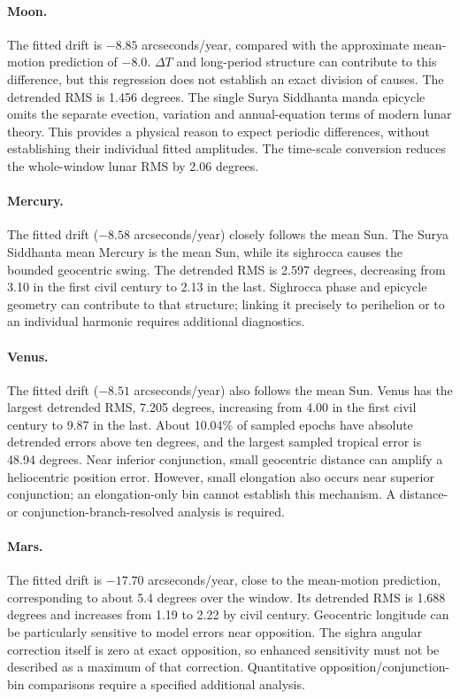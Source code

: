 \documentclass[11pt,a4paper]{article}
\newcommand{\dT}{$\Delta T$}
\begin{document}
\paragraph{Moon.} The fitted drift is $-8.85$ arcseconds/year, compared with the approximate mean-motion prediction of $-8.0$. \dT{} and long-period structure can contribute to this difference, but this regression does not establish an exact division of causes. The detrended RMS is 1.456 degrees. The single Surya Siddhanta manda epicycle omits the separate evection, variation and annual-equation terms of modern lunar theory. This provides a physical reason to expect periodic differences, without establishing their individual fitted amplitudes. The time-scale conversion reduces the whole-window lunar RMS by 2.06 degrees.

\paragraph{Mercury.} The fitted drift ($-8.58$ arcseconds/year) closely follows the mean Sun. The Surya Siddhanta mean Mercury is the mean Sun, while its sighrocca causes the bounded geocentric swing. The detrended RMS is 2.597 degrees, decreasing from 3.10 in the first civil century to 2.13 in the last. Sighrocca phase and epicycle geometry can contribute to that structure; linking it precisely to perihelion or to an individual harmonic requires additional diagnostics.

\paragraph{Venus.} The fitted drift ($-8.51$ arcseconds/year) also follows the mean Sun. Venus has the largest detrended RMS, 7.205 degrees, increasing from 4.00 in the first civil century to 9.87 in the last. About 10.04\% of sampled epochs have absolute detrended errors above ten degrees, and the largest sampled tropical error is 48.94 degrees. Near inferior conjunction, small geocentric distance can amplify a heliocentric position error. However, small elongation also occurs near superior conjunction; an elongation-only bin cannot establish this mechanism. A distance- or conjunction-branch-resolved analysis is required.

\paragraph{Mars.} The fitted drift is $-17.70$ arcseconds/year, close to the mean-motion prediction, corresponding to about 5.4 degrees over the window. Its detrended RMS is 1.688 degrees and increases from 1.19 to 2.22 by civil century. Geocentric longitude can be particularly sensitive to model errors near opposition. The sighra angular correction itself is zero at exact opposition, so enhanced sensitivity must not be described as a maximum of that correction. Quantitative opposition/conjunction-bin comparisons require a specified additional analysis.
\end{document}

